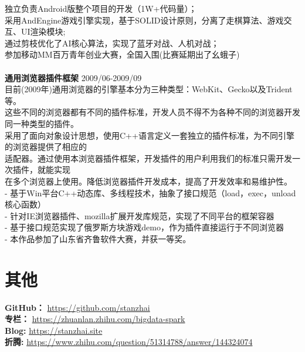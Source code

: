 \documentclass[UTF8,margin,line]{res}
\begin{document}
\begin{resume}
独立负责Android版整个项目的开发（1W+代码量）； \\
采用AndEngine游戏引擎实现，基于SOLID设计原则，分离了走棋算法、游戏交互、UI渲染模块; \\
通过剪枝优化了AI核心算法，实现了蓝牙对战、人机对战； \\
参加移动MM百万青年创业大赛，全国入围(比赛延期出了幺蛾子) \\
\\
\textbf{通用浏览器插件框架}  2009/06-2009/09 \\
目前(2009年)通用浏览器的引擎基本分为三种类型：WebKit、Gecko以及Trident等。 \\
这些不同的浏览器都有不同的插件标准，开发人员不得不为各种不同的浏览器开发同一种类型的插件。 \\
采用了面向对象设计思想，使用C++语言定义一套独立的插件标准，为不同引擎的浏览器提供了相应的 \\
适配器。通过使用本浏览器插件框架，开发插件的用户利用我们的标准只需开发一次插件，就能实现 \\
在多个浏览器上使用。降低浏览器插件开发成本，提高了开发效率和易维护性。 \\
- 基于Win平台C++动态库、多线程技术，抽象了接口规范（load，exec，unload核心函数） \\
- 针对IE浏览器插件、mozilla扩展开发库规范，实现了不同平台的框架容器 \\
- 基于接口规范实现了俄罗斯方块游戏demo，作为插件直接运行于不同浏览器 \\
- 本作品参加了山东省齐鲁软件大赛，并获一等奖。 \\

\section{\sc 其他}
\textbf{GitHub：} \url{https://github.com/stanzhai} \\
\textbf{专栏：} \url{https://zhuanlan.zhihu.com/bigdata-spark} \\
\textbf{Blog: } \url{https://stanzhai.site} \\
\textbf{折腾: } \url{https://www.zhihu.com/question/51314788/answer/144324074} \\

\end{resume}
\end{document}
